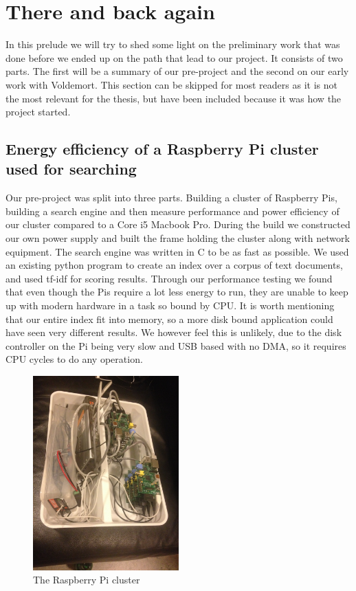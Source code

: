 \section*{There and back again}
\label{sec:prequel}
In this prelude we will try to shed some light on the preliminary work that was done before we ended up on the path that lead to our project. It consists of two parts. The first will be a summary of our pre-project and the second on our early work with Voldemort. 
This section can be skipped for most readers as it is not the most relevant for the thesis, but have been included because it was how the project started.

\subsection*{Energy efficiency of a Raspberry Pi cluster used for searching}
Our pre-project was split into three parts. Building a cluster of Raspberry Pis, building a search engine and then measure performance and power efficiency of our cluster compared to a Core i5 Macbook Pro. During the build we constructed our own power supply and built the frame holding the cluster along with network equipment. The search engine was written in C to be as fast as possible. We used an existing python program to create an index over a corpus of text documents, and used tf-idf for scoring results. Through our performance testing we found that even though the Pis require a lot less energy to run, they are unable to keep up with modern hardware in a task so bound by CPU. It is worth mentioning that our entire index fit into memory, so a more disk bound application could have seen very different results. We however feel this is unlikely, due to the disk controller on the Pi being very slow and USB based with no DMA, so it requires CPU cycles to do any operation.

\begin{figure}[h]
    \centering
    \includegraphics[width=0.5\textwidth]{thereandbackagain/cluster_beautiful.jpg}
    \caption{The Raspberry Pi cluster}
    \label{fig:cluster}
\end{figure}

